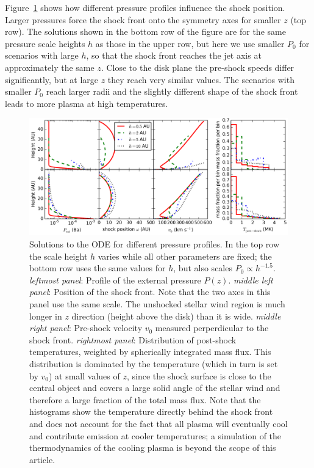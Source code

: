 \documentclass[manuscript]{aastex}
\begin{document}
Figure~\ref{fig:p_ext} shows how different pressure profiles influence the shock position. Larger pressures force the shock front onto the symmetry axes for smaller $z$ (top row). 
The solutions shown in the bottom row of the figure are for the same pressure scale heights $h$ as those in the upper row, but here we use smaller $P_0$ for scenarios with large $h$, so that the shock front reaches the jet axis at approximately the same $z$. Close to the disk plane the pre-shock speeds differ significantly, but at large $z$ they reach very similar values. The scenarios with smaller $P_0$ reach larger radii and the slightly different shape of the shock front leads to more plasma at high temperatures.

\begin{figure}[h!]
\begin{center}
\includegraphics[width=1\columnwidth]{figures/P_ext/P_ext.png}
\caption{\label{fig:p_ext}
Solutions to the ODE for different pressure profiles. In the top row the scale height $h$ varies while all other parameters are fixed; the bottom row uses the same values for $h$, but also scales $P_0\propto h^{-1.5}$.
\emph{leftmost panel}: Profile of the external pressure $P(z)$. 
\emph{middle left panel}: Position of the shock front. Note that the two axes in this panel use the same scale. The unshocked stellar wind region is much longer in $z$ direction (height above the disk) than it is wide. 
\emph{middle right panel}: Pre-shock velocity $v_0$ measured perperdicular to the shock front. 
\emph{rightmost panel}: Distribution of post-shock temperatures, weighted by spherically integrated mass flux. This distribution is dominated by the temperature (which in turn is set by $v_0$) at small values of $z$, since the shock surface is close to the central object and covers a large solid angle of the stellar wind and therefore a large fraction of the total mass flux. Note that the histograms show the temperature directly behind the shock front and does not account for the fact that all plasma will eventually cool and contribute emission at cooler temperatures; a simulation of the thermodynamics of the cooling plasma is beyond the scope of this article.}
\end{center}
\end{figure}
\end{document}
